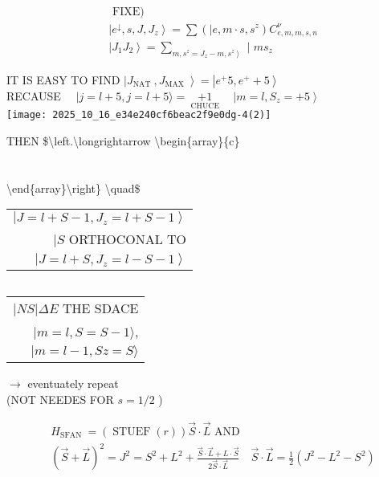 $$
\begin{aligned}
& \text { FIXE) } \\
& \left|e^{\downarrow}, s, J, J_{z}\right\rangle=\sum\left(\mid e, m \cdot s, s^{z}\right) C_{e, m, m, s, n}^{\nu} \\
& \left|J_{1} J_{2}\right\rangle=\sum_{\left.m, s^{z}=J_{z}-m, s^{z}\right\rangle} \mid m s_{z}
\end{aligned}
$$

IT IS EASY TO FIND $\left|J_{\text {NAT }}, J_{\text {MAX }}\right\rangle=\left|e^{+} 5, e^{+}+5\right\rangle$\\
RECAUSE $\quad|j=l+5, j=l+5\rangle=\underset{\text { CHUCE }}{\text { +1 }} \quad\left|m=l, S_{z}=+5\right\rangle$\\
\texttt{[image: 2025\_10\_16\_e34e240cf6beac2f9e0dg-4(2)]}

THEN \$\textbackslash left.\textbackslash longrightarrow \textbackslash begin\{array\}\{c\} \\
\\
 \\


\textbackslash end\{array\}\textbackslash right\} \textbackslash quad\$\begin{tabular}{r}
$\left|J=l+S-1, J_{z}=l+S-1\right\rangle$ \\
$\mid S$ ORTHOCONAL TO \\
$\left|J=l+S, J_{z}=l-S-1\right\rangle$ \\
\end{tabular}$\quad$\begin{tabular}{r}
$|N S| \Delta E$ THE SDACE \\
$|m=l, S=S-1\rangle$, \\
$|m=l-1, S z=S\rangle$ \\
\end{tabular}

$\rightarrow$ eventuately repeat\\
(NOT NEEDES FOR $s=1 / 2$ )

$$
\begin{aligned}
& H_{\text {SFAN }}=(\operatorname{STUEF}(r)) \vec{S} \cdot \vec{L} \text { AND } \\
& (\vec{S}+\vec{L})^{2}=J^{2}=S^{2}+L^{2}+\frac{\vec{S} \cdot \vec{L}+L \cdot \vec{S}}{2 \vec{S} \cdot \vec{L}} \quad \vec{S} \cdot \vec{L}=\frac{1}{2}\left(J^{2}-L^{2}-S^{2}\right)
\end{aligned}
$$

